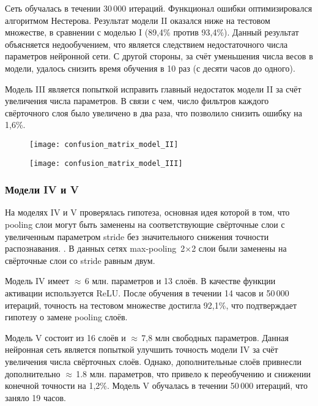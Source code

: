 Сеть обучалась в течении 30\,000 итераций. Функционал ошибки оптимизировался алгоритмом Нестерова.
Результат модели II оказался ниже на тестовом множестве, в сравнении с моделью I (89,4\% против 93,4\%).
Данный результат объясняется недообучением, что является следствием недостаточного числа параметров нейронной сети.
С другой стороны, за счёт уменьшения числа весов в модели, удалось снизить время обучения в 10 раз (с десяти часов до одного).

Модель III является попыткой исправить главный недостаток модели II за счёт увеличения числа параметров.
В связи с чем, число фильтров каждого свёрточного слоя было увеличено в два раза, что позволило снизить ошибку на 1,6\%.

\begin{figure}[H]
\centering
\begin{minipage}{.5\textwidth}
  \centering
  \texttt{[image: confusion\_matrix\_model\_II]}
\end{minipage}%
\begin{minipage}{.5\textwidth}
  \centering
  \texttt{[image: confusion\_matrix\_model\_III]}
\end{minipage}
\end{figure}

\subsubsection{Модели IV и V}
На моделях IV и V проверялась гипотеза, основная идея которой в том, что pooling слои могут быть заменены
на соответствующие свёрточные слои с увеличенным параметром stride без значительного снижения точности распознавания.
\cite{DBLP:journals/corr/SpringenbergDBR14}. В данных сетях max-pooling~2$\times$2 слои были заменены 
на свёрточные слои со stride равным двум.

Модель IV имеет $\approx$\,6 млн. параметров и 13 слоёв. В качестве функции активации используется ReLU.
После обучения в течении 14 часов и 50\,000 итераций, точность на тестовом множестве достигла 92,1\%, что
подтверждает гипотезу о замене pooling слоёв.

Модель V состоит из 16 слоёв и $\approx$\,7,8 млн свободных параметров. Данная нейронная сеть является попыткой
улучшить точность модели IV за счёт увеличения числа свёрточных слоёв. Однако, дополнительные слоёв привнесли
дополнительно $\approx$\,1.8 млн. параметров, что привело к переобучению и снижении конечной точности на 1,2\%.
Модель V обучалась в течении 50\,000 итераций, что заняло 19 часов.

